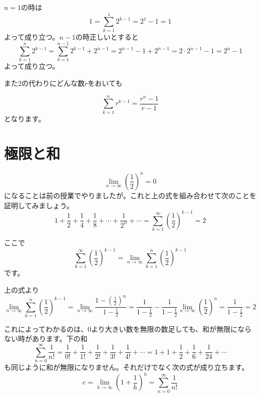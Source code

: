 \documentclass{ltjsarticle}
\begin{document}
$n=1$の時は
\begin{equation*}
1 = \sum_{k=1}^1 2^{k-1} = 2^1-1 =1
\end{equation*}
よって成り立つ。$n-1$の時正しいとすると
\begin{equation*}
\sum_{k=1}^n 2^{k-1} = \sum_{k=1}^{n-1} 2^{k-1}+2^{n-1} = 2^{n-1}-1 +2^{n-1} =2\cdot2^{n-1}-1 = 2^n-1
\end{equation*}
よって成り立つ。

また$2$の代わりにどんな数$r$をおいても

\begin{equation*}
\sum_{k=1}^n r^{k-1} ={\frac {r^n-1} {r-1}}
\end{equation*}
となります。

\section{極限と和}

\begin{equation*}
\lim_{n\to\infty} \left({\frac 1 2}\right)^n = 0
\end{equation*}
になることは前の授業でやりましたが。これと上の式を組み合わせて次のことを証明してみましょう。
\begin{equation*}
1+{\frac 1 2}+{\frac 1 4}+{\frac 1 8}+\cdots+{\frac 1 {2^n}}+\cdots=\sum_{k=1}^\infty \left({\frac 1 2}\right)^{k-1} = 2
\end{equation*}

ここで
\begin{equation*}
\sum_{k=1}^\infty \left({\frac 1 2}\right)^{k-1}=\lim_{n\to\infty}\sum_{k=1}^n \left({\frac 1 2}\right)^{k-1}
\end{equation*}
です。

上の式より
\begin{equation*}
\lim_{n\to\infty}\sum_{k=1}^n \left({\frac 1 2}\right)^{k-1} = \lim_{n\to\infty}{\frac {1-\left({\frac 1 2}\right)^n} {1-{\frac 1 2}}} = {\frac 1 {1-{\frac 1 2}}}-{\frac 1{1- {\frac 1 2}}}\lim_{n\to\infty}\left({\frac 1 2}\right)^n = {\frac 1 {1-{\frac 1 2}}} = 2
\end{equation*}

これによってわかるのは、$0$より大きい数を無限の数足しても、和が無限にならない時があります。下の和
\begin{equation*}
\sum_{n=0}^\infty {\frac 1 {n!}} = {\frac 1 {0!}}+{\frac 1 {1!}} +{\frac 1 {2!}}+{\frac 1 {3!}} + {\frac 1 {4!}} +\cdots=1+1+{\frac 1 2}+{\frac 1 6}+{\frac 1 {24}}+\cdots
\end{equation*}
も同じように和が無限になりません。それだけでなく次の式が成り立ちます。
\begin{equation*}
e = \lim_{h\to\infty}\left(1+{\frac 1 h}\right)^h = \sum_{n=0}^\infty {\frac 1 {n!}}
\end{equation*}
\end{document}
